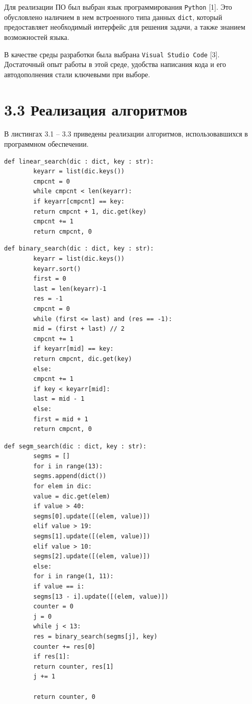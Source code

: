 \documentclass[12pt, a4paper]{report}
\begin{document}
	Для реализации ПО был выбран язык программирования \verb|Python| [1]. Это обусловлено наличием в нем встроенного типа данных \verb|dict|, который предоставляет необходимый интерфейс для решения задачи, а также знанием возможностей языка.
	
	В качестве среды разработки была выбрана \verb|Visual Studio Code| [3]. Достаточный опыт работы в этой среде, удобства написания кода и его автодополнения стали ключевыми при выборе.
	
	\section*{3.3 Реализация алгоритмов}
	
	В листингах 3.1 -- 3.3 приведены реализации алгоритмов, использовавшихся в программном обеспечении.
	
	\begin{lstlisting}[title=Листинг 3.1~--- Алгоритм полного перебора]
		def linear_search(dic : dict, key : str):
		keyarr = list(dic.keys())
		cmpcnt = 0
		while cmpcnt < len(keyarr):
		if keyarr[cmpcnt] == key:
		return cmpcnt + 1, dic.get(key)
		cmpcnt += 1
		return cmpcnt, 0
	\end{lstlisting}
	
	\begin{lstlisting}[title=Листинг 3.2~--- Бинарный поиск]
		def binary_search(dic : dict, key : str):
		keyarr = list(dic.keys())
		keyarr.sort()
		first = 0
		last = len(keyarr)-1
		res = -1
		cmpcnt = 0
		while (first <= last) and (res == -1):
		mid = (first + last) // 2
		cmpcnt += 1
		if keyarr[mid] == key:
		return cmpcnt, dic.get(key)
		else:
		cmpcnt += 1
		if key < keyarr[mid]:
		last = mid - 1
		else:
		first = mid + 1
		return cmpcnt, 0
	\end{lstlisting}
	
	\begin{lstlisting}[title=Листинг 3.3~--- Бинарный поиск по сегментам]
		def segm_search(dic : dict, key : str):
		segms = []
		for i in range(13):
		segms.append(dict())
		for elem in dic:
		value = dic.get(elem)
		if value > 40:
		segms[0].update([(elem, value)])
		elif value > 19:
		segms[1].update([(elem, value)])
		elif value > 10:
		segms[2].update([(elem, value)])
		else:
		for i in range(1, 11):
		if value == i:
		segms[13 - i].update([(elem, value)])
		counter = 0   
		j = 0
		while j < 13:
		res = binary_search(segms[j], key)
		counter += res[0]
		if res[1]:
		return counter, res[1]
		j += 1
		
		return counter, 0
	\end{lstlisting}
	
\end{document}
